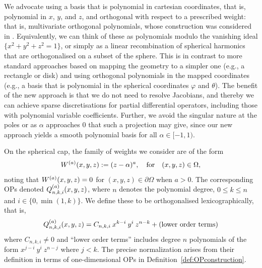 \documentclass[11pt, oneside]{article}   	%
\begin{document}
We advocate using a basis that is polynomial in cartesian coordinates, that is, polynomial in $x$, $y$, and $z$, and orthogonal with respect to a prescribed weight: that is, multivariate orthogonal polynomials, whose construction was considered in \cite{olver2020orthogonal}. Equivalently, we can think of these as polynomials modulo the vanishing ideal $\{ x^2 + y^2 + z^2 = 1 \}$, or simply as a linear recombination of spherical harmonics that are orthogonalised on a subset of the sphere. This is in contrast to more standard approaches based on mapping the geometry to a simpler one (e.g., a rectangle or disk) and using orthogonal polynomials in the mapped coordinates (e.g., a basis that is polynomial in the spherical coordinates $\varphi$ and $\theta$). The benefit of the new approach is that we do not need to resolve Jacobians, and thereby we can achieve sparse discretisations for partial differential operators, including those with polynomial variable coefficients. Further, we avoid the singular nature at the poles or  as $\alpha$ approaches $0$ that  such a projection may give, since our new approach yields a smooth polynomial basis for all $\alpha \in [-1,1)$. 

On the spherical cap, the family of weights we consider are of the form
\begin{align*}
	W^{(a)}(x,y,z) := (z - \alpha)^a, \quad\hbox{for}\quad (x,y,z) \in \Omega,
\end{align*}
noting that $W^{(a)}(x,y,z) = 0$ for $(x,y,z) \in \partial \Omega$ when $a > 0$. The corresponding OPs denoted $Q_{n,k,i}^{(a)}(x,y,z)$, where $n$ denotes the polynomial degree, $0 \le k \le n$ and $i \in \{0, \min(1,k)\}$. We define these to be orthogonalised lexicographically, that is,
\begin{align*}
	Q_{n,k,i}^{(a)}(x,y,z) = C_{n,k,i} \: x^{k-i} \: y^i \: z^{n-k} + (\hbox{lower order terms})
\end{align*}
where $C_{n,k,i} \neq 0$ and \enquote{lower order terms} includes degree $n$ polynomials of the form $x^{j - i} \: y^{i} \: z^{n-j}$ where $j < k$. The precise normalization arises from their definition in terms of one-dimensional OPs in Definition~\ref{def:OPconstruction}. 
\end{document}
